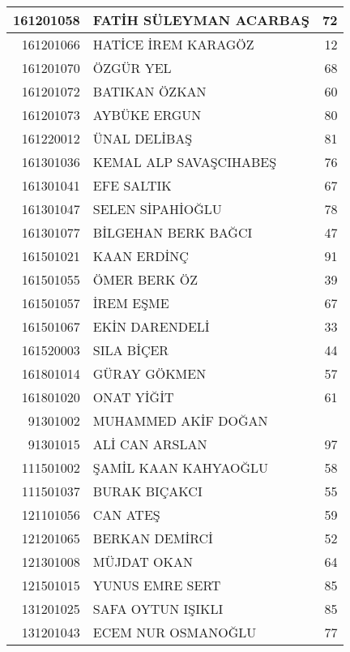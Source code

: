 \documentclass[12pt]{article}
\begin{document}
\begin{multicols}{2}
\begin{longtable}{||r||l||r||}
    \midrule
    161201058 & FATİH SÜLEYMAN ACARBAŞ & 72 \\
    \midrule
    161201066 & HATİCE İREM KARAGÖZ & 12 \\
    \midrule
    161201070 & ÖZGÜR YEL & 68 \\
    \midrule
    161201072 & BATIKAN ÖZKAN & \cellcolor[rgb]{ 1,  1,  0} 60 \\
    \midrule
    161201073 & AYBÜKE ERGUN & \cellcolor[rgb]{ 1,  1,  0} 80 \\
    \midrule
    161220012 & ÜNAL DELİBAŞ & 81 \\
    \midrule
    161301036 & KEMAL ALP SAVAŞCIHABEŞ & 76 \\
    \midrule
    161301041 & EFE SALTIK & 67 \\
    \midrule
    161301047 & SELEN SİPAHİOĞLU & \cellcolor[rgb]{ 1,  1,  0} 78 \\
    \midrule
    161301077 & BİLGEHAN BERK BAĞCI & \cellcolor[rgb]{ 1,  1,  0} 47 \\
    \midrule
    161501021 & KAAN ERDİNÇ & 91 \\
    \midrule
    161501055 & ÖMER BERK ÖZ & 39 \\
    \midrule
    161501057 & İREM EŞME & 67 \\
    \midrule
    161501067 & EKİN DARENDELİ & 33 \\
    \midrule
    161520003 & SILA BİÇER & \cellcolor[rgb]{ 1,  1,  0} 44 \\
    \midrule
    161801014 & GÜRAY GÖKMEN & 57 \\
    \midrule
    161801020 & ONAT YİĞİT & 61 \\
    \midrule
    91301002 & MUHAMMED AKİF DOĞAN &  \\
    \midrule
    91301015 & ALİ CAN ARSLAN & 97 \\
    \midrule
    111501002 & ŞAMİL KAAN KAHYAOĞLU & 58 \\
    \midrule
    111501037 & BURAK BIÇAKCI & 55 \\
    \midrule
    121101056 & CAN ATEŞ & 59 \\
    \midrule
    121201065 & BERKAN DEMİRCİ & 52 \\
    \midrule
    121301008 & MÜJDAT OKAN & 64 \\
    \midrule
    121501015 & YUNUS EMRE SERT & 85 \\
    \midrule
    131201025 & SAFA OYTUN IŞIKLI & \cellcolor[rgb]{ 1,  1,  0} 85 \\
    \midrule
    131201043 & ECEM NUR OSMANOĞLU & \cellcolor[rgb]{ 1,  1,  0} 77 \\

\end{longtable}
\end{multicols}
\end{document}
